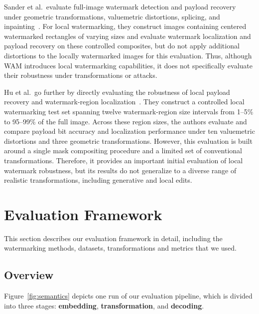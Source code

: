 \documentclass[sigconf,nonacm]{acmart}
\begin{document}
Sander et al.\ evaluate full-image watermark detection and payload recovery under geometric transformations, valuemetric distortions, splicing, and inpainting~\cite{wam}. For local watermarking, they construct images containing centered watermarked rectangles of varying sizes and evaluate watermark localization and payload recovery on these controlled composites, but do not apply additional distortions to the locally watermarked images for this evaluation. Thus, although WAM introduces local watermarking capabilities, it does not specifically evaluate their robustness under transformations or attacks.

Hu et al.\ go further by directly evaluating the robustness of local payload recovery and watermark-region localization~\cite{maskwm}. They construct a controlled local watermarking test set spanning twelve watermark-region size intervals from 1--5\% to 95--99\% of the full image. Across these region sizes, the authors evaluate and compare payload bit accuracy and localization performance under ten valuemetric distortions and three geometric transformations. However, this evaluation is built around a single mask compositing procedure and a limited set of conventional transformations. Therefore, it provides an important initial evaluation of local watermark robustness, but its results do not generalize to a diverse range of realistic transformations, including generative and local edits.


\section{Evaluation Framework}
\label{sec:benchmark-framework}
This section describes our evaluation framework in detail, including the watermarking methods, datasets, transformations and metrics that we used.

\subsection{Overview}

Figure~\ref{fig:semantics} depicts one run of our evaluation pipeline, which is divided into three stages: {\bf embedding}, {\bf transformation}, and {\bf decoding}.
\end{document}
